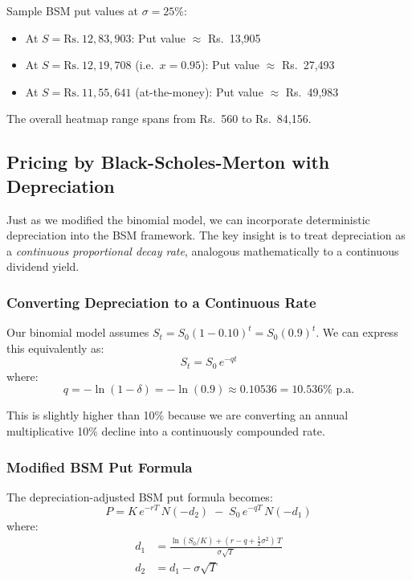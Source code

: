 \documentclass[11pt, a4paper]{article}
\begin{document}
Sample BSM put values at $\sigma = 25\%$:
\begin{itemize}
    \item At $S = \text{Rs.}~12{,}83{,}903$: Put value $\approx$ Rs.~13,905
    \item At $S = \text{Rs.}~12{,}19{,}708$ (i.e.\ $x = 0.95$): Put value $\approx$ Rs.~27,493
    \item At $S = \text{Rs.}~11{,}55{,}641$ (at-the-money): Put value $\approx$ Rs.~49,983
\end{itemize}

The overall heatmap range spans from Rs.~560 to Rs.~84,156.


\subsection{Pricing by Black-Scholes-Merton with Depreciation}
\label{sec:pricing_bsm_dep}

Just as we modified the binomial model, we can incorporate deterministic depreciation into the BSM framework. The key insight is to treat depreciation as a \emph{continuous proportional decay rate}, analogous mathematically to a continuous dividend yield.

\subsubsection{Converting Depreciation to a Continuous Rate}

Our binomial model assumes $S_t = S_0 (1 - 0.10)^t = S_0 (0.9)^t$. We can express this equivalently as:
\[
S_t = S_0 \, e^{-qt}
\]
where:
\begin{equation}
    q = -\ln(1 - \delta) = -\ln(0.9) \approx 0.10536 = 10.536\% \text{ p.a.}
\end{equation}

This is slightly higher than 10\% because we are converting an annual multiplicative 10\% decline into a continuously compounded rate.

\subsubsection{Modified BSM Put Formula}

The depreciation-adjusted BSM put formula becomes:
\begin{equation}
    P = K \, e^{-rT} \, N(-d_2) \;-\; S_0 \, e^{-qT} \, N(-d_1)
\end{equation}
where:
\begin{align}
    d_1 &= \frac{\ln(S_0/K) + (r - q + \tfrac{1}{2}\sigma^2)\,T}{\sigma\sqrt{T}} \\[6pt]
    d_2 &= d_1 - \sigma\sqrt{T}
\end{align}
\end{document}
